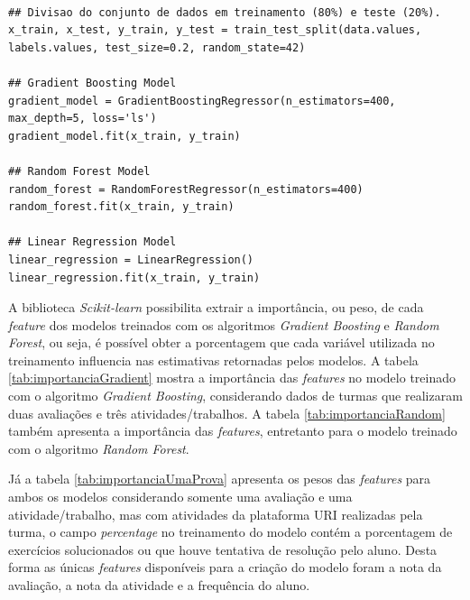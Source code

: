 \begin{lstlisting}[caption={Trecho de código para treinamento dos modelos de ML}, label={cod:treinamentoModelos}]

## Divisao do conjunto de dados em treinamento (80%) e teste (20%).
x_train, x_test, y_train, y_test = train_test_split(data.values, labels.values, test_size=0.2, random_state=42)

## Gradient Boosting Model
gradient_model = GradientBoostingRegressor(n_estimators=400, max_depth=5, loss='ls')
gradient_model.fit(x_train, y_train)

## Random Forest Model
random_forest = RandomForestRegressor(n_estimators=400)
random_forest.fit(x_train, y_train)

## Linear Regression Model
linear_regression = LinearRegression()
linear_regression.fit(x_train, y_train)
\end{lstlisting}

A biblioteca \textit{Scikit-learn} possibilita extrair a importância, ou peso, de cada \textit{feature} dos modelos treinados com os algoritmos \textit{Gradient Boosting} e \textit{Random Forest}, ou seja, é possível obter a porcentagem que cada variável utilizada no treinamento influencia nas estimativas retornadas pelos modelos.
A tabela \ref{tab:importanciaGradient} mostra a importância das \textit{features} no modelo treinado com o algoritmo \textit{Gradient Boosting}, considerando dados de turmas que realizaram duas avaliações e três atividades/trabalhos.
A tabela \ref{tab:importanciaRandom} também apresenta a importância das \textit{features}, entretanto para o modelo treinado com o algoritmo \textit{Random Forest}.





Já a tabela \ref{tab:importanciaUmaProva} apresenta os pesos das \textit{features} para ambos os modelos considerando somente uma avaliação e uma atividade/trabalho, mas com atividades da plataforma URI realizadas pela turma, o campo \textit{percentage} no treinamento do modelo contém a porcentagem de exercícios solucionados ou que houve tentativa de resolução pelo aluno.
Desta forma as únicas \textit{features} disponíveis para a criação do modelo foram a nota da avaliação, a nota da atividade e a frequência do aluno.



